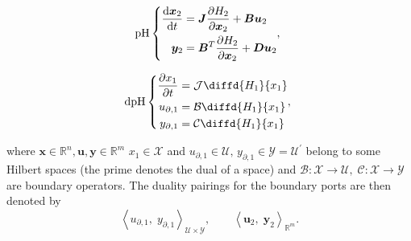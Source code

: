 \documentclass[letterpaper, 10 pt, conference]{ieeeconf}
\begin{document}
\noindent
\begin{minipage}{.5\linewidth}
	\begin{equation}
	\text{pH} \left\{ 
	\begin{aligned}
	\diff{\bm{x}_2}{t} &= \bm{J} \diffp{H_2}{\bm{x}_2} + \bm{B} \bm{u}_2 \\
	\bm{y}_{2} &= \bm{B}^T \diffp{H_2}{\bm{x}_2} + \bm{D} \bm{u}_2 \\
	\end{aligned},
	\right. 
	\end{equation}
\end{minipage} %
\begin{minipage}{.45\linewidth}
	\begin{equation}
	\text{dpH} \left\{ 
	\begin{aligned}
	\diffp{x_1}{t} &= \mathcal{J} \diffd{H_1}{x_1} \\
	u_{\partial, 1}  &= \mathcal{B} \diffd{H_1}{x_1} \\
	y_{\partial, 1} &= \mathcal{C} \diffd{H_1}{x_1} \\
	\end{aligned},
	\right.
	\end{equation} 
\end{minipage}

where $\bm{x} \in \mathbb{R}^n, \bm{u}, \bm{y} \in \mathbb{R}^m$ $x_1 \in \mathscr{X}$ and $u_{\partial, 1}  \in \mathscr{U}, \, y_{\partial, 1} \in  \mathscr{Y} = \mathscr{U}^\prime$ belong to some Hilbert spaces (the prime denotes the dual of a space)  and  $\mathcal{B}: \mathscr{X} \rightarrow \mathscr{U}, \; \mathcal{C}: \mathscr{X} \rightarrow \mathscr{Y}$ are boundary operators. The duality pairings for the boundary ports are then denoted by
\[
\left\langle u_{\partial, 1}, \; y_{\partial, 1} \right\rangle_{\mathscr{U} \times \mathscr{Y}},  \qquad
\left\langle \bm{u}_{2}, \; \bm{y}_{2} \right\rangle_{\mathbb{R}^m}.
\]
\end{document}
